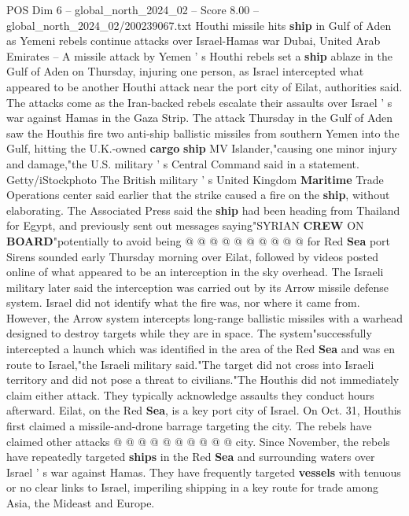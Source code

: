 \begin{textsample}{POS Dim 6 – global\_north\_2024\_02 – Score 8.00 – global\_north\_2024\_02/200239067.txt}  \label{ex:f6_pos_174}
Houthi missile hits \textbf{ship} in Gulf of Aden as Yemeni rebels continue attacks over Israel-Hamas war Dubai, United Arab Emirates -- A missile attack by Yemen ' s Houthi rebels set a \textbf{ship} ablaze in the Gulf of Aden on Thursday, injuring one person, as Israel intercepted what appeared to be another Houthi attack near the port city of Eilat, authorities said.
The attacks come as the Iran-backed rebels escalate their assaults over Israel ' s war against Hamas in the Gaza Strip.
The attack Thursday in the Gulf of Aden saw the Houthis fire two anti-ship ballistic missiles from southern Yemen into the Gulf, hitting the U.K.-owned \textbf{cargo} \textbf{ship} MV Islander,"causing one minor injury and damage,"the U.S. military ' s Central Command said in a statement.
Getty/iStockphoto The British military ' s United Kingdom \textbf{Maritime} Trade Operations center said earlier that the strike caused a fire on the \textbf{ship}, without elaborating.
The Associated Press said the \textbf{ship} had been heading from Thailand for Egypt, and previously sent out messages saying"SYRIAN \textbf{CREW} ON \textbf{BOARD}"potentially to avoid being @ @ @ @ @ @ @ @ @ @ for Red \textbf{Sea} port Sirens sounded early Thursday morning over Eilat, followed by videos posted online of what appeared to be an interception in the sky overhead.
The Israeli military later said the interception was carried out by its Arrow missile defense system.
Israel did not identify what the fire was, nor where it came from.
However, the Arrow system intercepts long-range ballistic missiles with a warhead designed to destroy targets while they are in space.
The system"successfully intercepted a launch which was identified in the area of the Red \textbf{Sea} and was en route to Israel,"the Israeli military said."The target did not cross into Israeli territory and did not pose a threat to civilians."The Houthis did not immediately claim either attack.
They typically acknowledge assaults they conduct hours afterward.
Eilat, on the Red \textbf{Sea}, is a key port city of Israel.
On Oct. 31, Houthis first claimed a missile-and-drone barrage targeting the city.
The rebels have claimed other attacks @ @ @ @ @ @ @ @ @ @ city.
Since November, the rebels have repeatedly targeted \textbf{ships} in the Red \textbf{Sea} and surrounding waters over Israel ' s war against Hamas.
They have frequently targeted \textbf{vessels} with tenuous or no clear links to Israel, imperiling shipping in a key route for trade among Asia, the Mideast and Europe.

\end{textsample}
